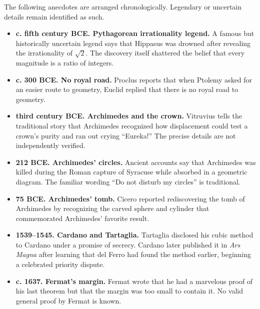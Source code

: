     \vspace{1em}

    The following anecdotes are arranged chronologically. Legendary or uncertain
    details remain identified as such.

    \vspace{0.25em}

    \begin{itemize}
        \item \textbf{c. fifth century BCE. Pythagorean irrationality legend.} A famous but
              historically uncertain legend says that Hippasus was drowned
              after revealing the irrationality of $\sqrt{2}$. The discovery
              itself shattered the belief that every magnitude is a ratio of
              integers.
        \item \textbf{c. 300 BCE. No royal road.} Proclus reports that when Ptolemy asked
              for an easier route to geometry, Euclid replied that there is no
              royal road to geometry.
        \item \textbf{third century BCE. Archimedes and the crown.} Vitruvius tells the traditional
              story that Archimedes recognized how displacement could test a
              crown's purity and ran out crying ``Eureka!'' The precise details
              are not independently verified.
        \item \textbf{212 BCE. Archimedes' circles.} Ancient accounts say that
              Archimedes was killed during the Roman capture of Syracuse while
              absorbed in a geometric diagram. The familiar wording ``Do not
              disturb my circles'' is traditional.
        \item \textbf{75 BCE. Archimedes' tomb.} Cicero reported rediscovering the tomb
              of Archimedes by recognizing the carved sphere and cylinder that
              commemorated Archimedes' favorite result.
        \item \textbf{1539--1545. Cardano and Tartaglia.} Tartaglia disclosed his cubic
              method to Cardano under a promise of secrecy. Cardano later
              published it in \textit{Ars Magna} after learning that del Ferro
              had found the method earlier, beginning a celebrated priority
              dispute.
        \item \textbf{c. 1637. Fermat's margin.} Fermat wrote that he had a marvelous
              proof of his last theorem but that the margin was too small to
              contain it. No valid general proof by Fermat is known.

\end{itemize}
